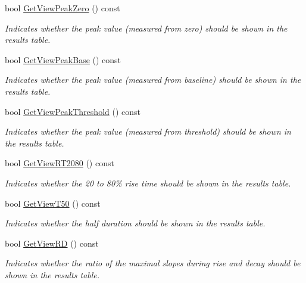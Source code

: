 \begin{DoxyCompactItemize}
bool \hyperlink{classRecording_aa590777ab5877a10c40cf676da0d0f07}{GetViewPeakZero} () const 
\begin{DoxyCompactList}\small\item\em Indicates whether the peak value (measured from zero) should be shown in the results table. \item\end{DoxyCompactList}\item 
bool \hyperlink{classRecording_a7b99cd64cb245a4dffc25117a0f5e70c}{GetViewPeakBase} () const 
\begin{DoxyCompactList}\small\item\em Indicates whether the peak value (measured from baseline) should be shown in the results table. \item\end{DoxyCompactList}\item 
bool \hyperlink{classRecording_a525e371c66292ae27ad21adf6661a047}{GetViewPeakThreshold} () const 
\begin{DoxyCompactList}\small\item\em Indicates whether the peak value (measured from threshold) should be shown in the results table. \item\end{DoxyCompactList}\item 
bool \hyperlink{classRecording_a9a75fa658358888e9f9a9d4e059f933d}{GetViewRT2080} () const 
\begin{DoxyCompactList}\small\item\em Indicates whether the 20 to 80\% rise time should be shown in the results table. \item\end{DoxyCompactList}\item 
bool \hyperlink{classRecording_a0a27de964fc417acd887954f92d2f3da}{GetViewT50} () const 
\begin{DoxyCompactList}\small\item\em Indicates whether the half duration should be shown in the results table. \item\end{DoxyCompactList}\item 
bool \hyperlink{classRecording_af54f7d88ea49c9fb1972aae1f626fbee}{GetViewRD} () const 
\begin{DoxyCompactList}\small\item\em Indicates whether the ratio of the maximal slopes during rise and decay should be shown in the results table. \item\end{DoxyCompactList}\item 

\end{DoxyCompactItemize}
